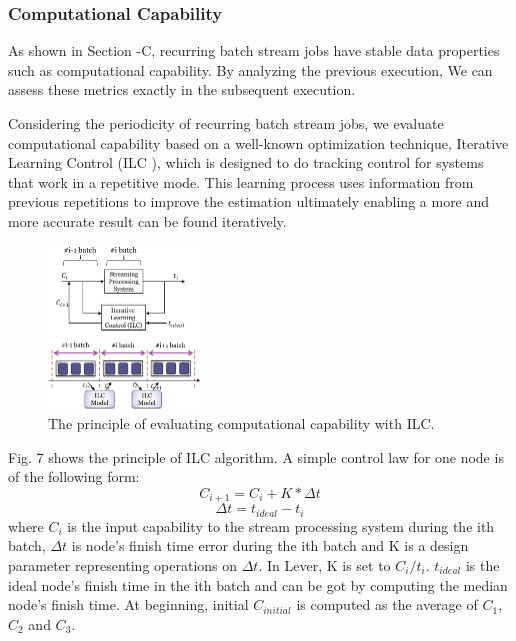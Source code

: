\documentclass[10pt,conference,compsocconf,letterpaper]{IEEEtran}
\begin{document}
\subsubsection{Computational Capability}

  As shown in Section \uppercase\expandafter{}-C, recurring batch stream jobs have stable data properties such as computational capability. By analyzing the previous execution, We can assess these metrics exactly in the subsequent execution.

  Considering the periodicity of recurring batch stream jobs, we evaluate computational capability based on a well-known optimization technique, Iterative Learning Control (ILC \cite{Arimoto}), which is designed to do tracking control for systems that work in a repetitive mode. This learning process uses information from previous repetitions to improve the estimation ultimately enabling a more and more accurate result can be found iteratively.
  \begin{figure}[htbp]
    \centering
    \includegraphics[width=0.36\textwidth]{FigureILC}
    \caption{The principle of evaluating computational capability with ILC.}
    \label{Fig. 7:}
  \end{figure}

  Fig. 7 shows the principle of ILC algorithm. A simple control law for one node is of the following form:
  \begin{equation}
  C_{i+1} = C_i + K*\Delta t
  \end{equation}
   \begin{equation}
  \Delta t = t_{ideal} - t_{i}
  \end{equation}
  where $C_i$ is the input capability to the stream processing system during the ith batch, $\Delta t$ is node's finish time error during the ith batch and K is a design parameter representing operations on $\Delta t$. In Lever, K is set to $C_i/t_i$. $t_{ideal}$ is the ideal node's finish time in the ith batch and can be got by computing the median node's finish time. At beginning, initial $C_{initial}$ is computed as the average of $C_1$, $C_2$ and $C_3$.
\end{document}
